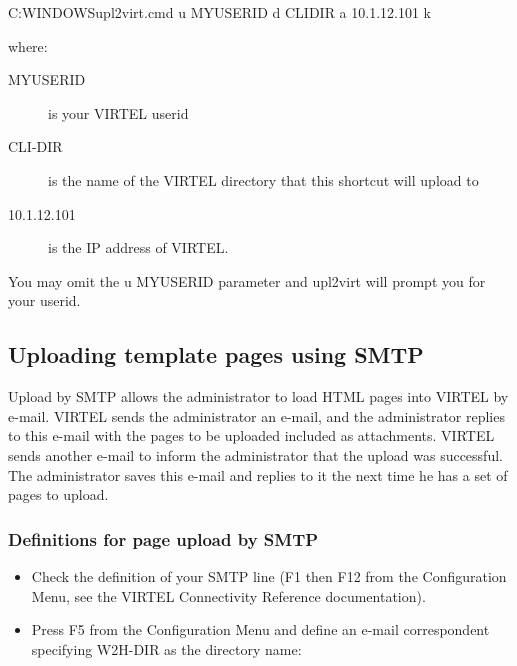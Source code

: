 \documentclass[letterpaper,10pt,english]{sphinxmanual}
\begin{document}
\begin{sphinxVerbatim}[commandchars=\\\{\}]
C:\PYGZbs{}WINDOWS\PYGZbs{}upl2virt.cmd \PYGZhy{}u MYUSERID \PYGZhy{}d CLI\PYGZhy{}DIR \PYGZhy{}a 10.1.12.101 \textendash{}k
\end{sphinxVerbatim}

where:
\begin{description}
\item[{MYUSERID}] \leavevmode
is your VIRTEL userid

\item[{CLI-DIR}] \leavevmode
is the name of the VIRTEL directory that this shortcut will upload to

\item[{10.1.12.101}] \leavevmode
is the IP address of VIRTEL.

\end{description}

You may omit the \textendash{}u MYUSERID parameter and upl2virt will prompt you for your userid.

\newpage
{}\label{\detokenize{audit_operations_ and_performance:v457ap-http-uploading-pages-smtp}}

\subsection{Uploading template pages using SMTP}
\label{\detokenize{audit_operations_ and_performance:uploading-template-pages-using-smtp}}\label{\detokenize{audit_operations_ and_performance:index-68}}
Upload by SMTP allows the administrator to load HTML pages into VIRTEL by e-mail. VIRTEL sends the administrator an e-mail, and the administrator replies to this e-mail with the pages to be uploaded included as attachments. VIRTEL sends another e-mail to inform the administrator that the upload was successful. The administrator saves this e-mail and replies to it the next time he has a set of pages to upload.


\subsubsection{Definitions for page upload by SMTP}
\label{\detokenize{audit_operations_ and_performance:definitions-for-page-upload-by-smtp}}\label{\detokenize{audit_operations_ and_performance:index-69}}\begin{itemize}
\item {} 
Check the definition of your SMTP line (F1 then F12 from the Configuration Menu, see the VIRTEL Connectivity Reference documentation).

\item {} 
Press F5 from the Configuration Menu and define an e-mail correspondent specifying W2H-DIR as the directory name:

\end{itemize}
\end{document}
